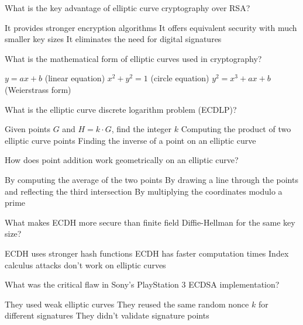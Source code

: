 \documentclass[10pt,a4paper,american]{exam}
\begin{document}
\begin{questions}
	\question What is the key advantage of elliptic curve cryptography over RSA?
	\begin{randomizechoices}
		\choice It provides stronger encryption algorithms
		\CorrectChoice It offers equivalent security with much smaller key sizes
		\choice It eliminates the need for digital signatures
	\end{randomizechoices}

	\question What is the mathematical form of elliptic curves used in cryptography?
	\begin{randomizechoices}
		\choice $y = ax + b$ (linear equation)
		\choice $x^2 + y^2 = 1$ (circle equation)
		\CorrectChoice $y^2 = x^3 + ax + b$ (Weierstrass form)
	\end{randomizechoices}

	\question What is the elliptic curve discrete logarithm problem (ECDLP)?
	\begin{randomizechoices}
		\CorrectChoice Given points $G$ and $H = k \cdot G$, find the integer $k$
		\choice Computing the product of two elliptic curve points
		\choice Finding the inverse of a point on an elliptic curve
	\end{randomizechoices}

	\question How does point addition work geometrically on an elliptic curve?
	\begin{randomizechoices}
		\choice By computing the average of the two points
		\CorrectChoice By drawing a line through the points and reflecting the third intersection
		\choice By multiplying the coordinates modulo a prime
	\end{randomizechoices}

	\question What makes ECDH more secure than finite field Diffie-Hellman for the same key size?
	\begin{randomizechoices}
		\choice ECDH uses stronger hash functions
		\choice ECDH has faster computation times
		\CorrectChoice Index calculus attacks don't work on elliptic curves
	\end{randomizechoices}

	\question What was the critical flaw in Sony's PlayStation 3 ECDSA implementation?
	\begin{randomizechoices}
		\choice They used weak elliptic curves
		\CorrectChoice They reused the same random nonce $k$ for different signatures
		\choice They didn't validate signature points
	\end{randomizechoices}


\end{questions}
\end{document}
